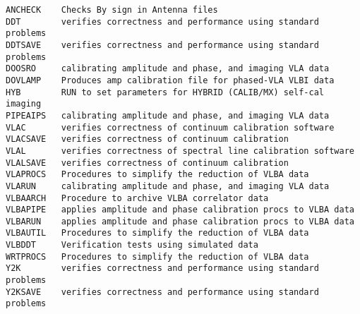 \vskip 0.5pt
\bbve\begin{verbatim}
ANCHECK    Checks By sign in Antenna files
DDT        verifies correctness and performance using standard problems
DDTSAVE    verifies correctness and performance using standard problems
DOOSRO     calibrating amplitude and phase, and imaging VLA data
DOVLAMP    Produces amp calibration file for phased-VLA VLBI data
HYB        RUN to set parameters for HYBRID (CALIB/MX) self-cal imaging
PIPEAIPS   calibrating amplitude and phase, and imaging VLA data
VLAC       verifies correctness of continuum calibration software
VLACSAVE   verifies correctness of continuum calibration
VLAL       verifies correctness of spectral line calibration software
VLALSAVE   verifies correctness of continuum calibration
VLAPROCS   Procedures to simplify the reduction of VLBA data
VLARUN     calibrating amplitude and phase, and imaging VLA data
VLBAARCH   Procedure to archive VLBA correlator data
VLBAPIPE   applies amplitude and phase calibration procs to VLBA data
VLBARUN    applies amplitude and phase calibration procs to VLBA data
VLBAUTIL   Procedures to simplify the reduction of VLBA data
VLBDDT     Verification tests using simulated data
WRTPROCS   Procedures to simplify the reduction of VLBA data
Y2K        verifies correctness and performance using standard problems
Y2KSAVE    verifies correctness and performance using standard problems
\end{verbatim}\eve


